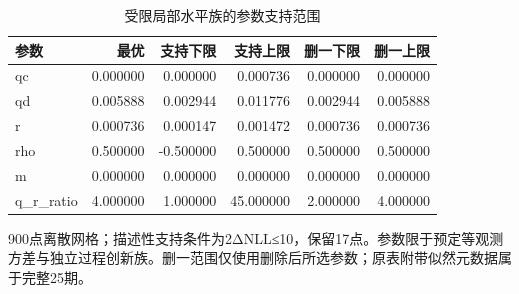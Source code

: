 \begin{table}[!htbp]\centering
\caption{受限局部水平族的参数支持范围}\label{tab:round2calibration}
\small\setlength{\tabcolsep}{4pt}
\begin{tabularx}{\linewidth}{L r r r r r}\toprule
参数 & 最优 & 支持下限 & 支持上限 & 删一下限 & 删一上限 \\
\midrule
qc & 0.000000 & 0.000000 & 0.000736 & 0.000000 & 0.000000 \\
qd & 0.005888 & 0.002944 & 0.011776 & 0.002944 & 0.005888 \\
r & 0.000736 & 0.000147 & 0.001472 & 0.000736 & 0.000736 \\
rho & 0.500000 & -0.500000 & 0.500000 & 0.500000 & 0.500000 \\
m & 0.000000 & 0.000000 & 0.000000 & 0.000000 & 0.000000 \\
q\_r\_ratio & 4.000000 & 1.000000 & 45.000000 & 2.000000 & 4.000000 \\
\bottomrule\end{tabularx}
\par\vspace{3pt}\begin{minipage}{\linewidth}\footnotesize 900点离散网格；描述性支持条件为2ΔNLL≤10，保留17点。参数限于预定等观测方差与独立过程创新族。删一范围仅使用删除后所选参数；原表附带似然元数据属于完整25期。\end{minipage}
\end{table}
